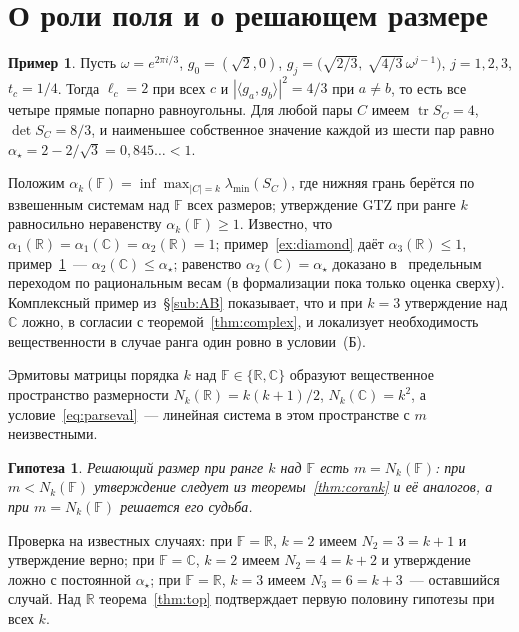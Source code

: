 \documentclass[11pt,a4paper]{article}
\theoremstyle{plain}
\newtheorem{conjecture}[theorem]{Гипотеза}
\theoremstyle{definition}
\newtheorem{example}[theorem]{Пример}
\theoremstyle{remark}
\DeclareMathOperator{\tr}{tr}
\newcommand{\RR}{\mathbb{R}}
\newcommand{\CC}{\mathbb{C}}
\newcommand{\FF}{\mathbb{F}}
\newcommand{\GTZ}{\mathrm{GTZ}}
\begin{document}
\section{О роли поля и о решающем размере}\label{sec:field}

\begin{example}\label{ex:sic}
Пусть $\omega=e^{2\pi i/3}$, $g_0=(\sqrt2,0)$,
$g_j=\bigl(\sqrt{2/3},\ \sqrt{4/3}\,\omega^{j-1}\bigr)$, $j=1,2,3$,
$t_c=1/4$. Тогда $\ell_c=2$ при всех $c$ и $|\langle g_a,g_b\rangle|^2=4/3$
при $a\ne b$, то есть все четыре прямые попарно равноугольны. Для любой пары
$C$ имеем $\tr S_C=4$, $\det S_C=8/3$, и наименьшее собственное значение
каждой из шести пар равно $\alpha_\star=2-2/\sqrt3=0{,}845\ldots<1$.
\end{example}

Положим $\alpha_k(\FF)=\inf\max_{|C|=k}\lambda_{\min}(S_C)$, где нижняя
грань берётся по взвешенным системам над $\FF$ всех размеров; утверждение
$\GTZ$ при ранге $k$ равносильно неравенству $\alpha_k(\FF)\ge1$. Известно,
что $\alpha_1(\RR)=\alpha_1(\CC)=\alpha_2(\RR)=1$; пример~\ref{ex:diamond}
даёт $\alpha_3(\RR)\le1$, пример~\ref{ex:sic}~--- $\alpha_2(\CC)\le\alpha_\star$;
равенство $\alpha_2(\CC)=\alpha_\star$ доказано в~\cite{main} предельным
переходом по рациональным весам (в формализации пока только оценка сверху).
Комплексный пример из~\S\ref{sub:AB} показывает, что и при $k=3$ утверждение
над $\CC$ ложно, в согласии с теоремой~\ref{thm:complex}, и локализует
необходимость вещественности в случае ранга один ровно в условии~(Б).

Эрмитовы матрицы порядка $k$ над $\FF\in\{\RR,\CC\}$ образуют вещественное
пространство размерности $N_k(\RR)=k(k+1)/2$, $N_k(\CC)=k^2$, а
условие~\eqref{eq:parseval}~--- линейная система в этом пространстве с $m$
неизвестными.

\begin{conjecture}\label{conj:law}
Решающий размер при ранге $k$ над $\FF$ есть $m=N_k(\FF)$: при $m<N_k(\FF)$
утверждение следует из теоремы~\ref{thm:corank} и её аналогов, а при
$m=N_k(\FF)$ решается его судьба.
\end{conjecture}

Проверка на известных случаях: при $\FF=\RR$, $k=2$ имеем $N_2=3=k+1$ и
утверждение верно; при $\FF=\CC$, $k=2$ имеем $N_2=4=k+2$ и утверждение
ложно с постоянной $\alpha_\star$; при $\FF=\RR$, $k=3$ имеем $N_3=6=k+3$~---
оставшийся случай. Над $\RR$ теорема~\ref{thm:top} подтверждает первую
половину гипотезы при всех $k$.
\end{document}
